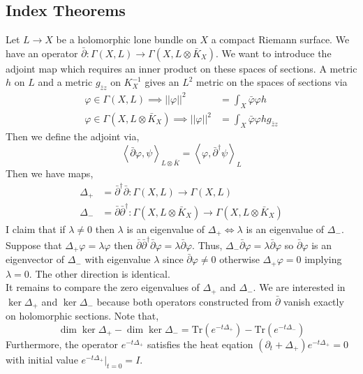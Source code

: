 \documentclass[12pt]{extarticle}
\newcommand{\Tr}[1]{\mathrm{Tr}\left( #1 \right)}
\theoremstyle{definition}
\begin{document}
\subsection{Index Theorems}

Let $L \to X$ be a holomorphic lone bundle on $X$ a compact Riemann surface. We have an operator $\bar{\partial} : \Gamma(X, L) \to \Gamma(X, L \otimes \bar{K}_X)$. We want to introduce the adjoint map which requires an inner product on these spaces of sections. A metric $h$ on $L$ and a metric $g_{\bar{z}z}$ on $K_X^{-1}$ gives an $L^2$ metric on the spaces of sections via
\begin{align*}
\varphi \in \Gamma(X, L) \implies ||\varphi||^2 & = \int_X \bar{\varphi} \varphi h 
\\
\varphi \in \Gamma(X, L \otimes \bar{K}_X) \implies ||\varphi||^2 & =\int_X \bar{\varphi} \varphi h g_{\bar{z} z} 
\end{align*}
Then we define the adjoint via,
\[ \left< \bar{\partial} \varphi, \psi \right>_{L \otimes \bar{K}} = \left< \varphi, \bar{\partial}^\dagger \psi \right>_L \]
Then we have maps,
\begin{align*}
\Delta_+ & = \bar{\partial}^\dagger \bar{\partial} : \Gamma(X, L) \to \Gamma(X, L)
\\
\Delta_{-} & = \bar{\partial} \bar{\partial}^\dagger : \Gamma(X, L \otimes \bar{K}_X) \to \Gamma(X, L \otimes \bar{K}_X)
\end{align*} 
I claim that if $\lambda \neq 0$ then $\lambda$ is an eigenvalue of $\Delta_{+} \iff \lambda$ is an eigenvalue of $\Delta_{-}$. 
Suppose that $\Delta_{+} \varphi = \lambda \varphi$ then $\bar{\partial} \bar{\partial}^\dagger \bar{\partial} \varphi = \lambda \bar{\partial} {\varphi}$. Thus, $\Delta_{-} \bar{\partial} \varphi = \lambda \bar{\partial} \varphi$ so $\bar{\partial} \varphi$ is an eigenvector of $\Delta_{-}$ with eigenvalue $\lambda$ since $\bar{\partial} \varphi \neq 0$ otherwise $\Delta_+ \varphi = 0$ implying $\lambda = 0$. The other direction is identical. 
\bigskip\\
It remains to compare the zero eigenvalues of $\Delta_{+}$ and $\Delta_{-}$. We are interested in $\ker{\Delta_{+}}$ and $\ker{\Delta_{-}}$ because both operators constructed from $\bar{\partial}$ vanish exactly on holomorphic sections. Note that,
\[ \dim{\ker{\Delta_{+}}} - \dim{\ker{\Delta_{-}}} = \Tr{e^{-t \Delta_{+}}} - \Tr{e^{- t \Delta_{-}}} \]
Furthermore, the operator $e^{-t \Delta_{+}}$ satisfies the heat eqation $(\partial_t + \Delta_+ ) e^{-t \Delta_{+}} = 0$ with initial value $e^{-t \Delta_{+}} |_{t = 0} = I$. 
\end{document}
